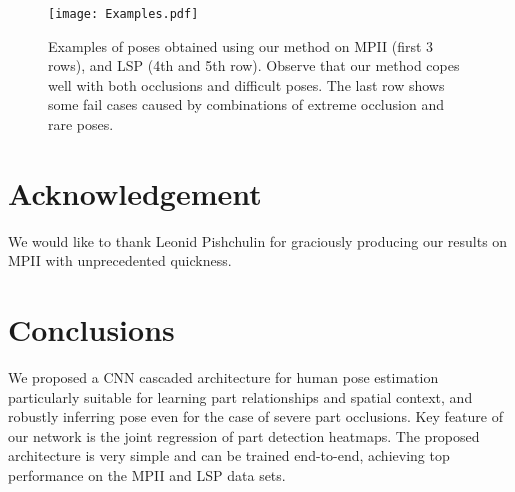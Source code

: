 \documentclass[runningheads]{llncs}
\begin{document}
\iffalse
\begin{figure*}[t!]
	\centering
	\subcaptionbox*{}{\texttt{[image: ./figures/mpii/pckh-total-mpii-legend.eps]}}
	\subcaptionbox*{}{\texttt{[image: ./figures/mpii/pckh-total-mpii.eps]}}
	\subcaptionbox*{}{\texttt{[image: ./figures/mpii/pckh-head-mpii.eps]}}
	\subcaptionbox*{}{\texttt{[image: ./figures/mpii/pckh-hip-mpii.eps]}}
	\subcaptionbox*{}{\texttt{[image: ./figures/mpii/pckh-knee-mpii.eps]}}
	\subcaptionbox*{}{\texttt{[image: ./figures/mpii/pckh-shoulder-mpii.eps]}}
	\subcaptionbox*{}{\texttt{[image: ./figures/mpii/pckh-wrist-mpii.eps]}}
	\subcaptionbox*{}{\texttt{[image: ./figures/mpii/pckh-elbow-mpii.eps]}}
	\subcaptionbox*{}{\texttt{[image: ./figures/mpii/pckh-ankle-mpii.eps]}}
	
	\caption{PCKh-based comparison with state-of-the-art on MPII.}
	\label{fig:MPII}
\end{figure*} 
\fi


\begin{figure}
\centering 
\texttt{[image: Examples.pdf]}
\caption{Examples of poses obtained using our method on MPII (first 3 rows), and LSP (4th and 5th row). Observe that our method copes well with both occlusions and difficult poses. The last row shows some fail cases caused by combinations of extreme occlusion and rare poses.}
\label{fig:examples}
\end{figure}  


\section{Acknowledgement}

We would like to thank Leonid Pishchulin for graciously producing our results on MPII with unprecedented quickness.


\section{Conclusions}

We proposed a CNN cascaded architecture for human pose estimation particularly suitable for learning part relationships and spatial context, and robustly inferring pose even for the case of severe part occlusions. Key feature of our network is the joint regression of part detection heatmaps. The proposed architecture is very simple and can be trained end-to-end, achieving top performance on the MPII and LSP data sets. 

\clearpage



\end{document}

